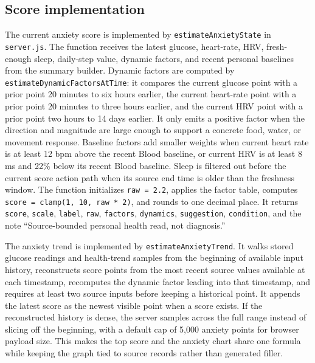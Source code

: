 \documentclass[12pt,letterpaper]{article}
\begin{document}
\subsection{Score implementation}

The current anxiety score is implemented by \texttt{estimateAnxietyState} in \texttt{server.js}. The function receives the latest glucose, heart-rate, HRV, fresh-enough sleep, daily-step value, dynamic factors, and recent personal baselines from the summary builder. Dynamic factors are computed by \texttt{estimateDynamicFactorsAtTime}: it compares the current glucose point with a prior point 20 minutes to six hours earlier, the current heart-rate point with a prior point 20 minutes to three hours earlier, and the current HRV point with a prior point two hours to 14 days earlier. It only emits a positive factor when the direction and magnitude are large enough to support a concrete food, water, or movement response. Baseline factors add smaller weights when current heart rate is at least 12 bpm above the recent Blood baseline, or current HRV is at least 8 ms and 22\% below its recent Blood baseline. Sleep is filtered out before the current score action path when its source end time is older than the freshness window. The function initializes \texttt{raw = 2.2}, applies the factor table, computes \texttt{score = clamp(1, 10, raw * 2)}, and rounds to one decimal place. It returns \texttt{score}, \texttt{scale}, \texttt{label}, \texttt{raw}, \texttt{factors}, \texttt{dynamics}, \texttt{suggestion}, \texttt{condition}, and the note \enquote{Source-bounded personal health read, not diagnosis.}

The anxiety trend is implemented by \texttt{estimateAnxietyTrend}. It walks stored glucose readings and health-trend samples from the beginning of available input history, reconstructs score points from the most recent source values available at each timestamp, recomputes the dynamic factor leading into that timestamp, and requires at least two source inputs before keeping a historical point. It appends the latest score as the newest visible point when a score exists. If the reconstructed history is dense, the server samples across the full range instead of slicing off the beginning, with a default cap of 5,000 anxiety points for browser payload size. This makes the top score and the anxiety chart share one formula while keeping the graph tied to source records rather than generated filler.
\end{document}
